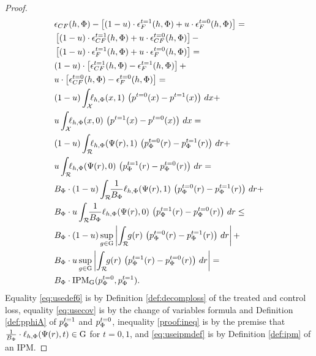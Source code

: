 \begin{proof}
\allowdisplaybreaks
\begin{align}
&\epsilon_{CF}(h,\Phi) - \left[ (1-u)\cdot \epsilon^{t=1}_{F}(h,\Phi) + u\cdot  \epsilon^{t=0}_{F}(h,\Phi) \right]= \nonumber \\
&\left[ (1-u)\cdot \epsilon^{t=1}_{CF}(h,\Phi) + u\cdot  \epsilon^{t=0}_{CF}(h,\Phi)\right] - \nonumber \\ 
&\left[ (1-u)\cdot \epsilon^{t=1}_{F}(h,\Phi) + u\cdot  \epsilon^{t=0}_{F}(h,\Phi)\right] = \nonumber  \\
&(1-u)\cdot \left[\epsilon^{t=1}_{CF}(h,\Phi)  - \epsilon^{t=1}_{F}(h,\Phi)\right]  + \nonumber \\
&u\cdot \left[\epsilon^{t=0}_{CF}(h,\Phi)  - \epsilon^{t=0}_{F}(h,\Phi)\right]  = \label{eq:usedef6}\\
&(1-u)\int_{\cX} \!\!\! \lyxoneh\, \left(\pc(x) - \pt(x)\right) \, dx  + \nonumber \\
& u  \int_{\cX} \!\!\!  \lyxzeroh\, \left(\pt(x) - \pc(x) \right)\, dx = \label{eq:usecov} \\
&(1-u)\int_{\cR} \!\!\! \lyonehpsi\, \left(\pc_\Phi(r) - \pt_\Phi(r)\right) \, dr  + \nonumber \\
& u  \int_{\cR} \!\!\!  \lyzerohpsi\, \left(\pt_\Phi(r) - \pc_\Phi(r) \right)\, dr = \nonumber \\
&B_\Phi \cdot (1-u)\int_{\cR} \!\! \frac{1}{B_\Phi}\lyonehpsi\, \left(\pc_\Phi(r) - \pt_\Phi(r)\right) \, dr  + \nonumber \\
& B_\Phi \cdot  u  \int_{\cR} \!\! \frac{1}{B_\Phi} \lyzerohpsi\, \left(\pt_\Phi(r) - \pc_\Phi(r) \right)\, dr \leq \label{proof:ineq} \\
&B_\Phi \cdot (1-u)\sup_{g\in \cF} \left| \int_{\cR} \!\! g(r)\, \left(\pc_\Phi(r) - \pt_\Phi(r)\right) \, dr  \right| + \nonumber \\
& B_\Phi \cdot u \sup_{g\in \cF} \left| \int_{\cR} \!\! g(r)\, \left(\pt_\Phi(r) - \pc_\Phi(r) \right)\, dr \right| = \label{eq:useipmdef}\\
&B_\Phi \cdot \text{IPM}_\cF(\pc_\Phi,\pt_\Phi) .
\end{align}
Equality \eqref{eq:usedef6} is by Definition \ref{def:decomploss} of the treated and control loss, equality \eqref{eq:usecov} is by the change of variables formula and Definition \ref{def:pphiA} of $p^{t=1}_\Phi$ and $p^{t=0}_\Phi$, inequality \eqref{proof:ineq} is by the premise that $\frac{1}{B_\Phi} \cdot  \ell_{h,\Phi}(\Psi(r),t) \in \mathrm{G}$ for $t=0,1$, and \eqref{eq:useipmdef} is by Definition \ref{def:ipm} of an IPM.
\end{proof}


